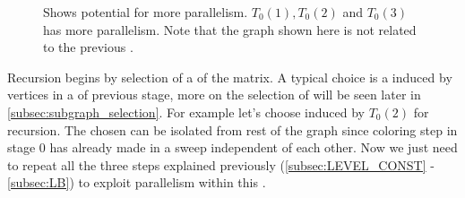      \begin{figure}[thbp]
     	\centering
     	\hspace{1.5em}
     	\hspace{1.5em}
        \caption{Shows potential for more parallelism. $T_0(1),T_0(2)$ and $T_0(3)$ has more parallelism. Note that the graph shown here is not related to the previous \stex.}
     	\label{fig:rec_d1_s1}
     \end{figure}
     
     Recursion begins by selection of a \subgraph of the matrix. A typical choice is a \subgraph induced by vertices in a \levelGroup of previous stage, more on the selection of \subgraph will be seen later in \cref{subsec:subgraph_selection}. For example let's choose \subgraph induced by $T_0(2)$ for recursion. The chosen \subgraph can be isolated from rest of the graph since  \DONE coloring step in stage 0 has already made \levelGroups in a sweep independent of each other. Now we just need to repeat all the three steps explained previously (\cref{subsec:LEVEL_CONST} - \cref{subsec:LB}) to exploit parallelism within this \subgraph.
   
